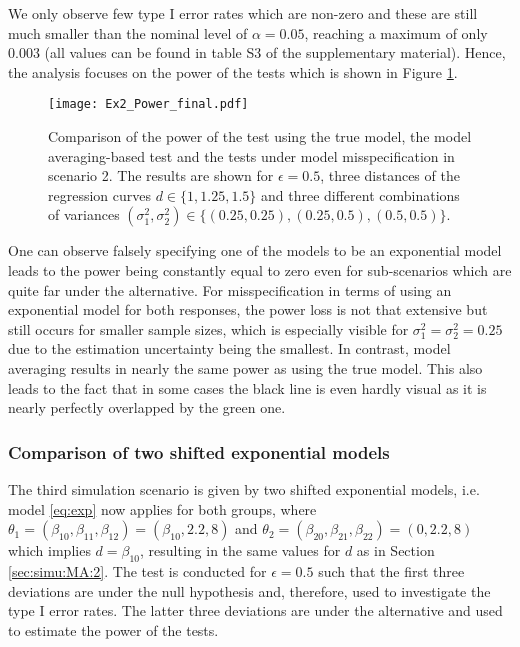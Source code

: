 {We only observe few type I error rates which are non-zero and these are still much smaller than the nominal level of $\alpha = 0.05$, reaching a maximum of only $0.003$ (all values can be found in table S3 of the supplementary material). Hence, the analysis focuses on the power of the tests which is shown in Figure \ref{fig:Ex2_Power}.
\begin{figure}
        \centering
        \texttt{[image: Ex2\_Power\_final.pdf]}
        \caption{Comparison of the power of the test using the true model, the model averaging-based test and the tests under model misspecification in scenario 2. The results are shown for $\epsilon = 0.5$, three distances of the regression curves $d \in \{1, 1.25, 1.5\}$ and three different combinations of variances $(\sigma_1^2, \sigma_2^2) \in \{(0.25, 0.25), (0.25, 0.5), (0.5, 0.5)\}.$}
        \label{fig:Ex2_Power} 
\end{figure}
One can observe falsely specifying one of the models to be an exponential model leads to the power being constantly equal to zero even for sub-scenarios which are quite far under the alternative. For misspecification in terms of using an exponential model for both responses, the power loss is not that extensive but still occurs for smaller sample sizes, which is especially visible for $\sigma^2_1 = \sigma^2_2 = 0.25$ due to the estimation uncertainty being  the smallest. 
In contrast, model averaging results in nearly the same power as using the true model. This also leads to the fact that in some cases the black line is even hardly visual as it is nearly perfectly overlapped by the green one.

\subsubsection{Comparison of two shifted exponential models} \label{sec:simu:MA:3}
The third simulation scenario is given by two shifted exponential models, i.e. model \ref{eq:exp} now applies for both groups, where $\theta_1 = (\beta_{10}, \beta_{11}, \beta_{12}) = (\beta_{10}, 2.2, 8)$ and $\theta_2 = (\beta_{20}, \beta_{21}, \beta_{22}) = (0, 2.2, 8)$ which implies $d = \beta_{10}$, resulting in the same values for $d$ as in Section \ref{sec:simu:MA:2}. The test is conducted for $\epsilon = 0.5$ such that the first three deviations are under the null hypothesis and, therefore, used to investigate the type I error rates. The latter three deviations are under the alternative and used to estimate the power of the tests.  

}

